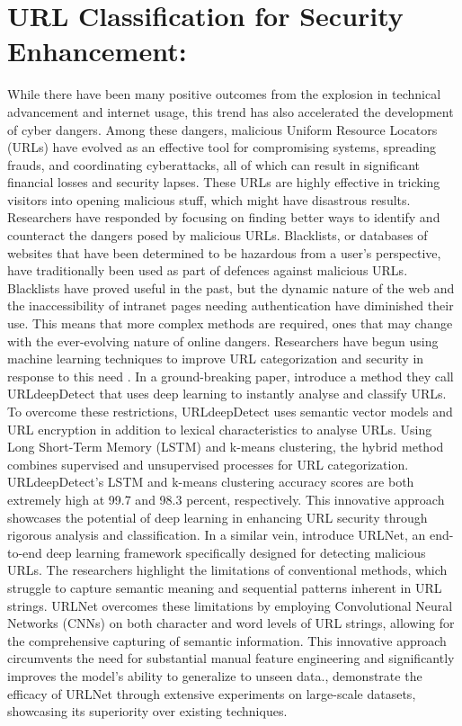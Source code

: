 \section{URL Classification for Security Enhancement:}
While there have been many positive outcomes from the explosion in technical advancement and internet usage, this trend has also accelerated the development of cyber dangers. Among these dangers, malicious Uniform Resource Locators (URLs) have evolved as an effective tool for compromising systems, spreading frauds, and coordinating cyberattacks, all of which can result in significant financial losses and security lapses. These URLs are highly effective in tricking visitors into opening malicious stuff, which might have disastrous results. Researchers have responded by focusing on finding better ways to identify and counteract the dangers posed by malicious URLs.
Blacklists, or databases of websites that have been determined to be hazardous from a user's perspective, have traditionally been used as part of defences against malicious URLs. Blacklists have proved useful in the past, but the dynamic nature of the web and the inaccessibility of intranet pages needing authentication have diminished their use. This means that more complex methods are required, ones that may change with the ever-evolving nature of online dangers. Researchers have begun using machine learning techniques to improve URL categorization and security in response to this need \cite{jeyaraj2020smart}.
In a ground-breaking paper, \cite{afzal2021urldeepdetect}introduce a method they call URLdeepDetect that uses deep learning to instantly analyse and classify URLs. To overcome these restrictions, URLdeepDetect uses semantic vector models and URL encryption in addition to lexical characteristics to analyse URLs. Using Long Short-Term Memory (LSTM) and k-means clustering, the hybrid method combines supervised and unsupervised processes for URL categorization. URLdeepDetect's LSTM and k-means clustering accuracy scores are both extremely high at 99.7 and 98.3 percent, respectively. This innovative approach showcases the potential of deep learning in enhancing URL security through rigorous analysis and classification.
In a similar vein,\cite{le2018urlnet} introduce URLNet, an end-to-end deep learning framework specifically designed for detecting malicious URLs. The researchers highlight the limitations of conventional methods, which struggle to capture semantic meaning and sequential patterns inherent in URL strings. URLNet overcomes these limitations by employing Convolutional Neural Networks (CNNs) on both character and word levels of URL strings, allowing for the comprehensive capturing of semantic information. This innovative approach circumvents the need for substantial manual feature engineering and significantly improves the model's ability to generalize to unseen data.\cite{le2018urlnet}, demonstrate the efficacy of URLNet through extensive experiments on large-scale datasets, showcasing its superiority over existing techniques.
